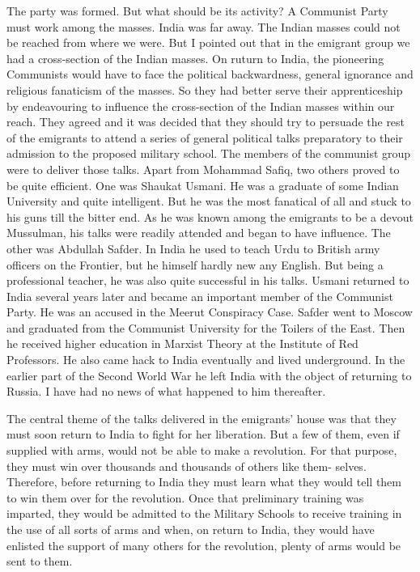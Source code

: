 The party was formed. But what should be its activity? A Communist Party must work among the masses. India was far away. The Indian masses could not be reached from where we were. But I pointed out that in the emigrant group we had a cross-section of the Indian masses. On ruturn to India, the pioneering Communists would have to face the political backwardness, general ignorance and religious fanaticism of the masses. So they had better serve their apprenticeship by endeavouring to influence the cross-section of the Indian masses within our reach. They agreed and it was decided that they should try to persuade the rest of the emigrants to attend a series of general political talks preparatory to their admission to the proposed military school. The members of the communist group were to deliver those talks. Apart from Mohammad Safiq, two others proved to be quite efficient. One was Shaukat Usmani. He was a graduate of some Indian University and quite intelligent. But he was the most fanatical of all and stuck to his guns till the bitter end. As he was known among the emigrants to be a devout Mussulman, his talks were readily attended and began to have influence. The other was Abdullah Safder. In India he used to teach Urdu to British army officers on the Frontier, but he himself hardly new any English. But being a professional teacher, he was also quite successful in his talks. Usmani returned to India several years later and became an important member of the Communist Party. He was an accused in the Meerut Conspiracy Case. Safder went to Moscow and graduated from the Communist University for the Toilers of the East. Then he received higher education in Marxist Theory at the Institute of Red Professors. He also came hack to India eventually and lived underground. In the earlier part of the Second World War he left India with the object of returning to Russia. I have had no news of what happened to him thereafter. 

The central theme of the talks delivered in the emigrants' house was that they must soon return to India to fight for her liberation. But a few of them, even if supplied with arms, would not be able to make a revolution. For that purpose, they must win over thousands and thousands of others like them- selves. Therefore, before returning to India they must learn what they would tell them to win them over for the revolution. 
Once that preliminary training was imparted, they would be admitted to the Military Schools to receive training in the use of all sorts of arms and when, on return to India, they would have enlisted the support of many others for the revolution, plenty of arms would be sent to them. 

